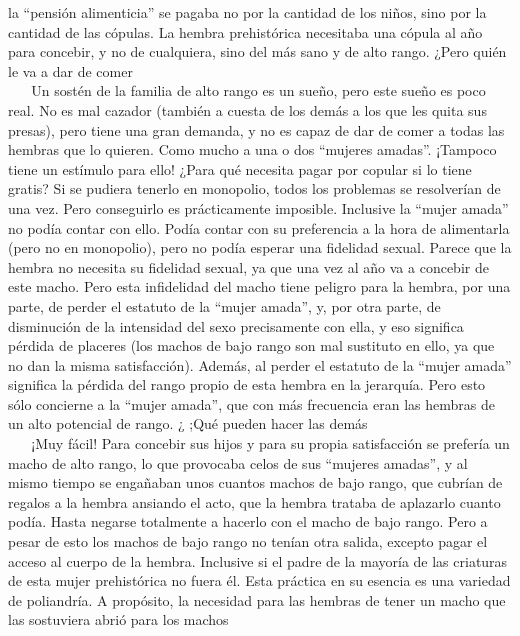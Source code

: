 la ``pensión alimenticia'' se pagaba no por la cantidad de los niños,
sino por la cantidad de las cópulas. La hembra prehistórica necesitaba
una cópula al año para concebir, y no de cualquiera, sino del más sano y
de alto rango. ¿Pero quién le va a dar de comer\\
\hspace*{0.333em} ~ ~ Un sostén de la familia de alto rango es un sueño,
pero este sueño es poco real. No es mal cazador (también a cuesta de los
demás a los que les quita sus presas), pero tiene una gran demanda, y no
es capaz de dar de comer a todas las hembras que lo quieren. Como mucho
a una o dos ``mujeres amadas''. ¡Tampoco tiene un estímulo para ello!
¿Para qué necesita pagar por copular si lo tiene gratis? Si se pudiera
tenerlo en monopolio, todos los problemas se resolverían de una vez.
Pero conseguirlo es prácticamente imposible. Inclusive la ``mujer
amada'' no podía contar con ello. Podía contar con su preferencia a la
hora de alimentarla (pero no en monopolio), pero no podía esperar una
fidelidad sexual. Parece que la hembra no necesita su fidelidad sexual,
ya que una vez al año va a concebir de este macho. Pero esta infidelidad
del macho tiene peligro para la hembra, por una parte, de perder el
estatuto de la ``mujer amada'', y, por otra parte, de disminución de la
intensidad del sexo precisamente con ella, y eso significa pérdida de
placeres (los machos de bajo rango son mal sustituto en ello, ya que no
dan la misma satisfacción). Además, al perder el estatuto de la ``mujer
amada'' significa la pérdida del rango propio de esta hembra en la
jerarquía. Pero esto sólo concierne a la ``mujer amada'', que con más
frecuencia eran las hembras de un alto potencial de rango. ¿ ;Qué pueden
hacer las demás\\
\hspace*{0.333em} ~ ~ ¡Muy fácil! Para concebir sus hijos y para su
propia satisfacción se prefería un macho de alto rango, lo que provocaba
celos de sus ``mujeres amadas'', y al mismo tiempo se engañaban unos
cuantos machos de bajo rango, que cubrían de regalos a la hembra
ansiando el acto, que la hembra trataba de aplazarlo cuanto podía. Hasta
negarse totalmente a hacerlo con el macho de bajo rango. Pero a pesar de
esto los machos de bajo rango no tenían otra salida, excepto pagar el
acceso al cuerpo de la hembra. Inclusive si el padre de la mayoría de
las criaturas de esta mujer prehistórica no fuera él. Esta práctica en
su esencia es una variedad de poliandría. A propósito, la necesidad para
las hembras de tener un macho que las sostuviera abrió para los machos
